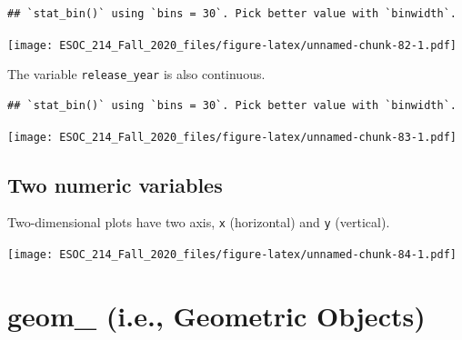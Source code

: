 \documentclass[
]{book}
\newenvironment{Shaded}{\begin{snugshade}}{\end{snugshade}}
\newcommand{\DataTypeTok}[1]{\textcolor[rgb]{0.13,0.29,0.53}{#1}}
\newcommand{\KeywordTok}[1]{\textcolor[rgb]{0.13,0.29,0.53}{\textbf{#1}}}
\newcommand{\NormalTok}[1]{#1}
\newcommand{\OperatorTok}[1]{\textcolor[rgb]{0.81,0.36,0.00}{\textbf{#1}}}
\newcommand{\StringTok}[1]{\textcolor[rgb]{0.31,0.60,0.02}{#1}}
\begin{document}
\begin{verbatim}
## `stat_bin()` using `bins = 30`. Pick better value with `binwidth`.
\end{verbatim}

\texttt{[image: ESOC\_214\_Fall\_2020\_files/figure-latex/unnamed-chunk-82-1.pdf]}

The variable \texttt{release\_year} is also continuous.

\begin{Shaded}
\end{Shaded}

\begin{verbatim}
## `stat_bin()` using `bins = 30`. Pick better value with `binwidth`.
\end{verbatim}

\texttt{[image: ESOC\_214\_Fall\_2020\_files/figure-latex/unnamed-chunk-83-1.pdf]}

\hypertarget{two-numeric-variables}{%
\subsection{Two numeric variables}\label{two-numeric-variables}}

Two-dimensional plots have two axis, \texttt{x} (horizontal) and \texttt{y} (vertical).

\begin{Shaded}
\end{Shaded}

\texttt{[image: ESOC\_214\_Fall\_2020\_files/figure-latex/unnamed-chunk-84-1.pdf]}

\hypertarget{geom_-i.e.-geometric-objects}{%
\section{geom\_ (i.e., Geometric Objects)}\label{geom_-i.e.-geometric-objects}}
\end{document}
